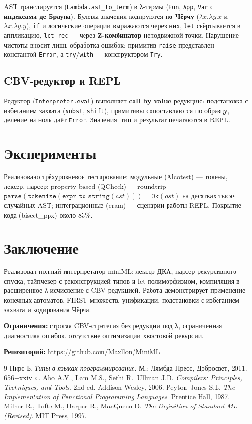 \documentclass[a4paper]{article}
\begin{document}
AST транслируется (\texttt{Lambda.ast\_to\_term}) в λ-термы (\texttt{Fun}, \texttt{App}, \texttt{Var} с \textbf{индексами де Брауна}). Булевы значения кодируются \textbf{по Чёрчу} ($\lambda x.\lambda y.x$ и $\lambda x.\lambda y.y$), \texttt{if} и логические операции выражаются через них, \texttt{let} свёртывается в аппликацию, \texttt{let rec} — через \textbf{Z-комбинатор} неподвижной точки. Нарушение чистоты вносит лишь обработка ошибок: примитив \texttt{raise} представлен константой \texttt{Error}, а \texttt{try}/\texttt{with} — конструктором \texttt{Try}.

\subsection{CBV-редуктор и REPL}

Редуктор (\texttt{Interpreter.eval}) выполняет \textbf{call-by-value}-редукцию: подстановка с избеганием захвата (\texttt{subst}, \texttt{shift}), примитивы сопоставляются по образцу, деление на ноль даёт \texttt{Error}. Значения, тип и результат печатаются в REPL.

\section{Эксперименты}

Реализовано трёхуровневое тестирование: модульные (Alcotest) — токены, лексер, парсер; property-based (QCheck) — roundtrip $\texttt{parse}(\texttt{tokenize}(\texttt{expr\_to\_string}(\mathit{ast}))) = \texttt{Ok}(\mathit{ast})$ на десятках тысяч случайных AST; интеграционные (cram) — сценарии работы REPL. Покрытие кода (bisect\_ppx) около 83\%.

\section{Заключение}

Реализован полный интерпретатор miniML: лексер-ДКА, парсер рекурсивного спуска, тайпчекер с реконструкцией типов и let-полиморфизмом, компиляция в расширенное λ-исчисление с CBV-редукцией. Работа демонстрирует применение конечных автоматов, FIRST-множеств, унификации, подстановки с избеганием захвата и кодирования Чёрча.

\textbf{Ограничения:} строгая CBV-стратегия без редукции под λ, ограниченная диагностика ошибок, отсутствие оптимизации хвостовой рекурсии.

\textbf{Репозиторий:} \url{https://github.com/Maxllon/MiniML}

\begin{thebibliography}{9}
     Пирс Б. {\itshape Типы в языках программирования}. М.: Лямбда Пресс, Добросвет, 2011. 656+xxiv~с.
     Aho A.V., Lam M.S., Sethi R., Ullman J.D. {\itshape Compilers: Principles, Techniques, and Tools}. 2nd ed. Addison-Wesley, 2006.
     Peyton~Jones S.L. {\itshape The Implementation of Functional Programming Languages}. Prentice Hall, 1987.
     Milner R., Tofte M., Harper R., MacQueen D. {\itshape The Definition of Standard ML (Revised)}. MIT Press, 1997.
\end{thebibliography}
\end{document}
